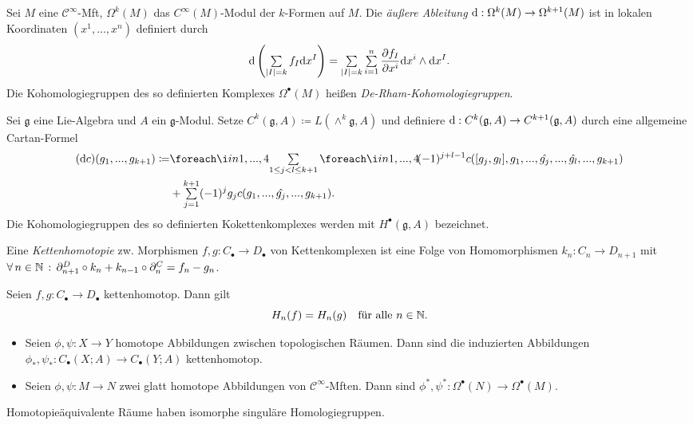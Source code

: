 \documentclass{cheat-sheet}
\newcommand{\nspace}[1]{\foreach \i in {1,...,#1}{ \! }} %
\newcommand{\CC}[1]{{#1}_{\bullet}} %
\newcommand{\Lg}{\mathfrak{g}} %
\begin{document}

\begin{defn}
  Sei $M$ eine $\mathcal{C}^\infty$-Mft, $\Omega^k(M)$ das $C^\infty(M)$-Modul der $k$-Formen auf $M$. Die \emph{äußere Ableitung} $\mathrm{d} : \Omega^k(M) \to \Omega^{k+1}(M)$ ist in lokalen Koordinaten $(x^1, ..., x^n)$ definiert durch
  \[ \d \left( \sum_{\abs{I} = k} f_I \d x^I \right) = \sum_{\abs{I} = k} \sum_{i=1}^n \frac{\partial f_I}{\partial x^i} \d x^i \wedge \d x^I. \]
  Die Kohomologiegruppen des so definierten Komplexes $\Omega^\bullet(M)$ heißen \emph{De-Rham-Kohomologiegruppen}.
\end{defn}


\begin{defn}
  Sei $\Lg$ eine Lie-Algebra und $A$ ein $\Lg$-Modul. Setze $C^k(\Lg, A) \coloneqq L(\wedge^k \Lg, A)$ und definiere $\d : C^k(\Lg, A) \to C^{k+1}(\Lg, A)$ durch eine allgemeine Cartan-Formel
  \begin{align*}
    (\d c)(g_1, ..., g_{k+1}) \coloneqq & \nspace{4} \sum_{1 \leq j < l \leq k+1} \nspace{4} (-1)^{j+l-1} c([g_j, g_l], g_1, ..., \hat{g_j}, ..., \hat{g_l}, ..., g_{k+1}) \\
    & + \sum_{j=1}^{k+1} (-1)^j g_j c(g_1, ..., \hat{g_j}, ..., g_{k+1}).
  \end{align*}
  Die Kohomologiegruppen des so definierten Kokettenkomplexes werden mit $H^\bullet(\Lg, A)$ bezeichnet.
\end{defn}

\begin{defn}
  Eine \emph{Kettenhomotopie} zw. Morphismen $f, g : \CC{C} \to \CC{D}$ von Kettenkomplexen ist eine Folge von Homomorphismen $k_n : C_n \to D_{n+1}$ mit
  $\forall \, {n \in \mathbb{N}} \,:\, \partial^D_{n+1} \circ k_n + k_{n-1} \circ \partial^C_n = f_n - g_n$.
\end{defn}

\begin{lem}
  Seien $f, g : \CC{C} \to \CC{D}$ kettenhomotop. Dann gilt
  \[ H_n(f) = H_n(g) \quad \text{für alle $n \in \mathbb{N}$.} \]
\end{lem}

\begin{prop}
  \begin{itemize}
    \item Seien $\phi, \psi : X \to Y$ homotope Abbildungen zwischen topologischen Räumen. Dann sind die induzierten Abbildungen $\phi_*, \psi_* : \CC{C}(X; A) \to \CC{C}(Y; A)$ kettenhomotop.
    \item Seien $\phi, \psi : M \to N$ zwei glatt homotope Abbildungen von $\mathcal{C}^\infty$-Mften. Dann sind $\phi^*, \psi^* : \Omega^\bullet(N) \to \Omega^\bullet(M)$.
  \end{itemize}
\end{prop}

\begin{kor}
  Homotopieäquivalente Räume haben isomorphe singuläre Homologiegruppen.
\end{kor}
\end{document}
